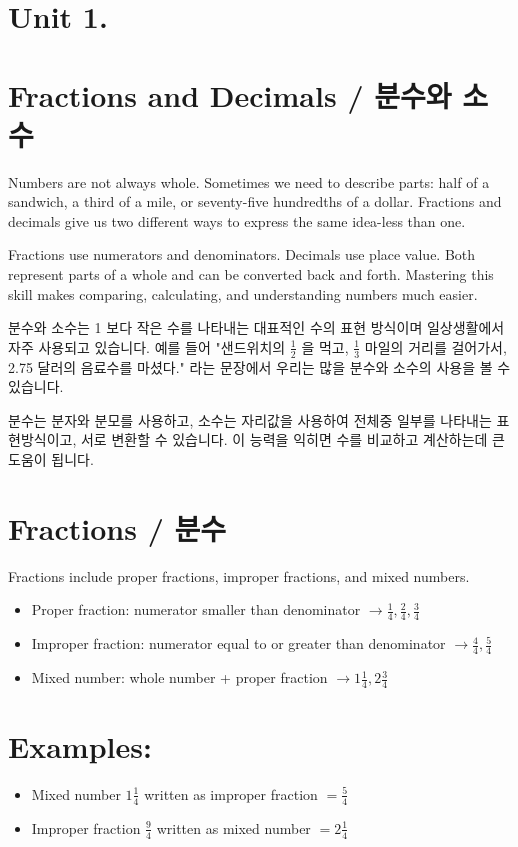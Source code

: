 \documentclass[10pt]{article}
\begin{document}
\section*{Unit 1.}
\section*{Fractions and Decimals / 분수와 소수}
Numbers are not always whole. Sometimes we need to describe parts: half of a sandwich, a third of a mile, or seventy-five hundredths of a dollar. Fractions and decimals give us two different ways to express the same idea-less than one.

Fractions use numerators and denominators. Decimals use place value. Both represent parts of a whole and can be converted back and forth. Mastering this skill makes comparing, calculating, and understanding numbers much easier.

분수와 소수는 1 보다 작은 수를 나타내는 대표적인 수의 표현 방식이며 일상생활에서 자주 사용되고 있습니다. 예를 들어 "샌드위치의 $\frac{1}{2}$ 을 먹고, $\frac{1}{3}$ 마일의 거리를 걸어가서, 2.75 달러의 음료수를 마셨다." 라는 문장에서 우리는 많을 분수와 소수의 사용을 볼 수 있습니다.

분수는 분자와 분모를 사용하고, 소수는 자리값을 사용하여 전체중 일부를 나타내는 표현방식이고, 서로 변환할 수 있습니다. 이 능력을 익히면 수를 비교하고 계산하는데 큰 도움이 됩니다.

\section*{Fractions / 분수}
Fractions include proper fractions, improper fractions, and mixed numbers.

\begin{itemize}
  \item Proper fraction: numerator smaller than denominator $\rightarrow \frac{1}{4}, \frac{2}{4}, \frac{3}{4}$
  \item Improper fraction: numerator equal to or greater than denominator $\rightarrow \frac{4}{4}, \frac{5}{4}$
  \item Mixed number: whole number + proper fraction $\rightarrow 1 \frac{1}{4}, 2 \frac{3}{4}$
\end{itemize}

\section*{Examples:}
\begin{itemize}
  \item Mixed number $1 \frac{1}{4}$ written as improper fraction $=\frac{5}{4}$
  \item Improper fraction $\frac{9}{4}$ written as mixed number $=2 \frac{1}{4}$
\end{itemize}
\end{document}
